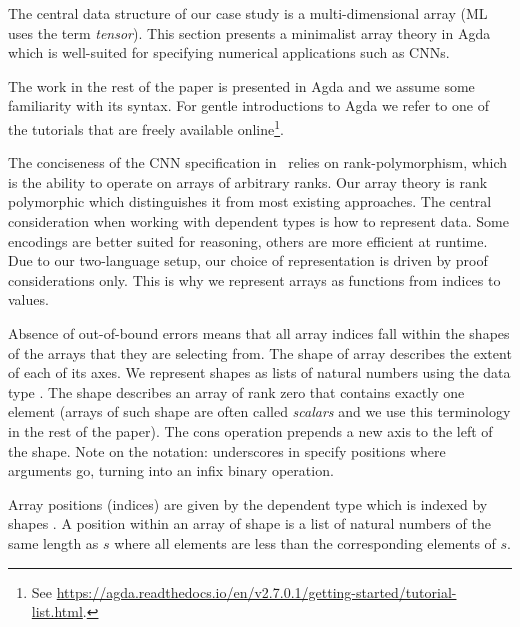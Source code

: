 The central data structure of our case study is a multi-dimensional array (ML
uses the term \emph{tensor}).  This section presents a minimalist array theory in Agda
which is well-suited for specifying numerical applications such as CNNs.

The work in the rest of the paper is presented in Agda and we assume some
familiarity with its syntax.
For gentle introductions to Agda we refer to one of the tutorials that are freely available
online\footnote{See \url{https://agda.readthedocs.io/en/v2.7.0.1/getting-started/tutorial-list.html}.}.

The conciseness of the CNN specification
in~\cite{cnn-array} relies on rank-polymorphism, which is the ability to operate
on arrays of arbitrary ranks.  Our array theory is rank polymorphic
which distinguishes it from most existing approaches.
The central consideration when working with dependent types is how to represent data.
Some encodings are better suited for reasoning, others are more efficient
at runtime.  Due to our two-language setup, our choice of representation is
driven by proof considerations only.
This is why we represent arrays as functions from indices to values.

Absence of out-of-bound errors means that all array indices fall within
the shapes of the arrays that they are selecting from.
The shape of array describes the extent of each of its axes.  We represent
shapes as lists of natural numbers using the data type .
The \AC{[]} shape describes an array of rank zero that contains exactly one
element (arrays of such shape are often called \emph{scalars} and we use this
terminology in the rest of the paper).
The cons operation  prepends a new axis to the left of the shape.
Note on the notation: underscores in  specify positions where
arguments go, turning  into an infix binary operation.

Array positions (indices) are given by the dependent type  which
is indexed by shapes .  A position within an array of shape 
is a list of natural numbers of the same length as $s$ where all elements
are less than the corresponding elements of $s$.

